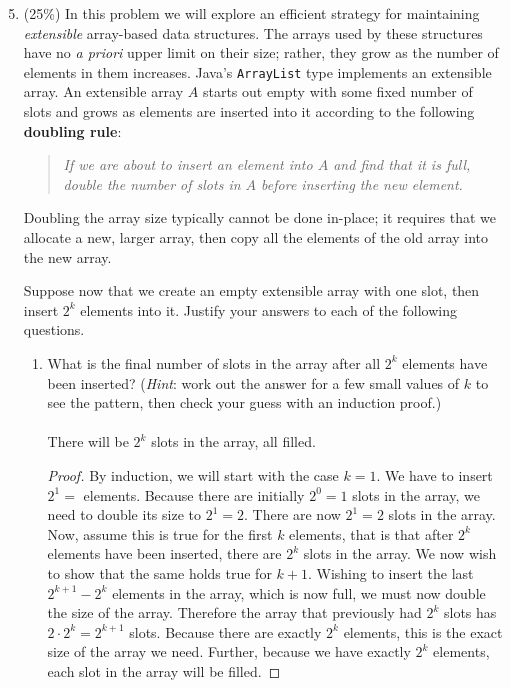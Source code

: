\documentclass[11pt]{article}
\begin{document}
\begin{enumerate}
\setcounter{enumi}{4}
\item (25\%)
In this problem we will explore an efficient strategy for maintaining
\textit{extensible} array-based data structures.  The arrays used by
these structures have no \textit{a priori} upper limit on their size;
rather, they grow as the number of elements in them increases.  Java's
\texttt{ArrayList} type implements an extensible array.
An extensible array $A$ starts out empty with some fixed number of
slots and grows as elements are inserted into it according to
the following \textbf{doubling rule}:
\begin{quote}
\textit{If we are about to insert an element into $A$ and find that it is
full, double the number of slots in $A$ before inserting the new
element.}
\end{quote}
Doubling the array size typically cannot be done in-place; it requires
that we allocate a new, larger array, then copy all the elements of
the old array into the new array.

Suppose now that we create an empty extensible array with one slot,
then insert $2^k$ elements into it.  Justify your answers to each of
the following questions.

\begin{enumerate}

\item
What is the final number of slots in the array after all $2^k$
elements have been inserted? (\textit{Hint}: work out the answer for
a few small values of $k$ to see the pattern, then check your
guess with an induction proof.)
\\ \\
There will be $2^k$ slots in the array, all filled.
\begin{proof}
By induction, we will start with the case $k=1$.  We have to insert $2^1=$ elements.  Because there are initially $2^0=1$ slots in the array, we need to double its size to $2^1=2$.  There are now $2^1=2$ slots in the array.  Now, assume this is true for the first $k$ elements, that is that after $2^k$ elements have been inserted, there are $2^k$ slots in the array.  We now wish to show that the same holds true for $k+1$.  Wishing to insert the last $2^{k+1}-2^k$ elements in the array, which is now full, we must now double the size of the array.  Therefore the array that previously had $2^k$ slots has $2 \cdot  2^k= 2^{k+1}$ slots.  Because there are exactly $2^k$ elements, this is the exact size of the array we need.  Further, because we have exactly $2^k$ elements, each slot in the array will be filled.
\end{proof}



\end{enumerate}
\end{enumerate}
\end{document}
